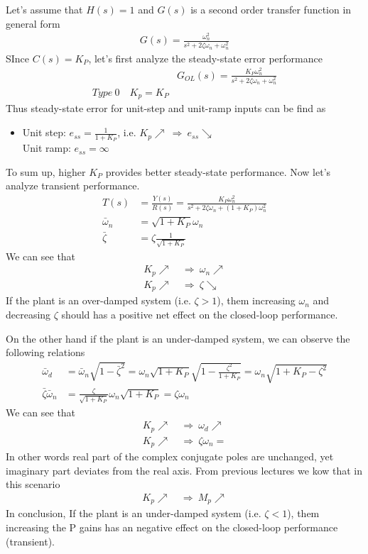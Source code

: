 \documentclass[twoside]{article}
\begin{document}
Let's assume that $H(s) = 1$ and $G(s)$ is a second order
transfer function in general form 
%
  \begin{align*}
  G(s) = \frac{\omega_n^2}{s^2 + 2 \zeta \omega_n + \omega_n^2}
  \end{align*}
%
SInce $C(s) = K_P$, let's first analyze the steady-state error performance
%
\begin{align*}
  &G_{OL}(s) = \frac{K_P \omega_n^2}{s^2 + 2 \zeta \omega_n + \omega_n^2}
\\
 Type \ 0 \quad K_p = K_P
\end{align*}
% 
Thus steady-state error for unit-step and unit-ramp inputs can be find
as
\begin{itemize}
\item Unit step: $e_{ss} = \frac{1}{1 + K_P}$, i.e. $K_p \nearrow \
  \Rightarrow \ e_{ss} \searrow$  
\\ Unit ramp: $e_{ss} = \infty$
\end{itemize}
%
To sum up, higher $K_P$ provides better steady-state performance.
Now let's analyze transient performance.
%
%
  \begin{align*}
  T(s) &= \frac{Y(s)}{R(s)} = \frac{K_P \omega_n^2}{s^2 + 2 \zeta
    \omega_n  + (1 + K_P) \omega_n^2}
\\
 \bar{\omega}_n &= \sqrt{1 + K_P} \omega_n
\\
 \bar{\zeta} &= \zeta \frac{1}{ \sqrt{ 1 + K_P} } 
  \end{align*}
%
We can see that
%
  \begin{align*}
    K_p \nearrow \ &\Rightarrow \ \omega_n \nearrow \\
   K_p \nearrow \ &\Rightarrow \ \zeta \searrow  
  \end{align*}
%
If the plant is an over-damped system (i.e. $\zeta > 1$), them increasing
$\omega_n$ and decreasing $\zeta$ should has a positive net 
effect on the closed-loop performance. 

On the other hand if the plant is an under-damped system, 
we can observe the following relations 
%
\begin{align*}
\bar{\omega}_d &= \bar{\omega}_n \sqrt{1 - \bar{\zeta}^2} = \omega_n
  \sqrt{1 + K_P}  \sqrt{1 - \frac{\zeta^2}{ 1 + K_P } } 
  = \omega_n \sqrt{ 1 + K_P -\zeta^2 } 
\\
\bar{\zeta} \bar{\omega}_n &= \frac{\zeta}{ \sqrt{ 1 + K_P } }
                             \omega_n \sqrt{1 + K_P} = \zeta \omega_n
\end{align*}
%
We can see that
%
  \begin{align*}
    K_p \nearrow \ &\Rightarrow \ \omega_d \nearrow \\
   K_p \nearrow \ &\Rightarrow \ \zeta \omega_n \mathrm{=}
  \end{align*}
%
In other words real part of the complex conjugate poles
are unchanged, yet imaginary part deviates from the real 
axis. From previous lectures we kow that in this scenario
%
  \begin{align*}
    K_p \nearrow \ &\Rightarrow \ M_p \nearrow 
  \end{align*}
%
In conclusion, If the plant is an under-damped system (i.e. $\zeta <
1$), them increasing the P gains has an negative effect on 
the closed-loop performance (transient). 
\end{document}
